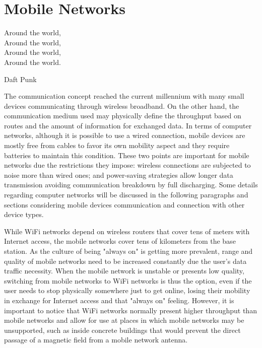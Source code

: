 \chapter{Mobile Networks}
\label{cap:mobilenetworks}

 \epigraph{
 Around the world,\\
 Around the world,\\
 Around the world,\\
 Around the world.}
 {Daft Punk}

The communication concept reached the current millennium with many small devices communicating through wireless broadband.
On the other hand, the communication medium used may physically define the throughput based on routes and the amount of information for exchanged data.
In terms of computer networks, although it is possible to use a wired connection, mobile devices are mostly free from cables to favor its own mobility aspect and they require batteries to maintain this condition.
These two points are important for mobile networks due the restrictions they impose: wireless connections are subjected to noise more than wired ones; and power-saving strategies allow longer data transmission avoiding communication breakdown by full discharging.
Some details regarding computer networks will be discussed in the following paragraphs and sections considering mobile devices communication and connection with other device types. 

While WiFi networks depend on wireless routers that cover tens of meters with Internet access, the mobile networks cover tens of kilometers from the base station.
As the culture of being "always on" is getting more prevalent, range and quality of mobile networks need to be increased constantly due the user's data traffic necessity.
When the mobile network is unstable or presents low quality, switching from mobile networks to WiFi networks is thus the option, even if the user needs to stop physically somewhere just to get online, losing their mobility in exchange for Internet access and that "always on" feeling.
However, it is important to notice that WiFi networks normally present higher throughput than mobile networks and allow for use at places in which mobile networks may be unsupported, such as inside concrete buildings that would prevent the direct passage of a magnetic field from a mobile network antenna.

